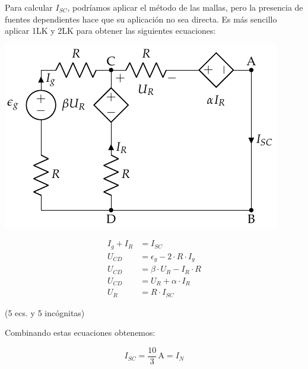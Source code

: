 \vspace{2mm}
Para calcular $I_{SC}$, podríamos aplicar el método de las mallas, pero la presencia de fuentes dependientes hace que su aplicación no sea directa. Es más sencillo aplicar 1LK y 2LK para obtener las siguientes ecuaciones:

\begin{minipage}{0.5\linewidth}
  \includegraphics[width=.95\linewidth]{figuras/norton_corto.pdf}
\end{minipage}
\begin{minipage}{0.5\linewidth}

    \vspace{-3mm}
  \begin{align*}
    I_g+ I_R &= I_{SC}\\    
    U_{CD} &= \epsilon_g - 2 \cdot R \cdot I_g\\
    U_{CD} &= \beta \cdot U_R - I_R \cdot R\\
    U_{CD} &= U_R + \alpha \cdot I_R\\
    U_R &= R \cdot I_{SC}
  \end{align*}

    \vspace{-4mm}
    \begin{center}
      (5 ecs. y 5 incógnitas)
    \end{center}

    \vspace{-2mm}
    Combinando estas ecuaciones obtenemos:
    
    \begin{equation*}
      I_{SC} = \boxed{\frac{10}{3}\,\si{\ampere} = I_N}
    \end{equation*}
\end{minipage}

